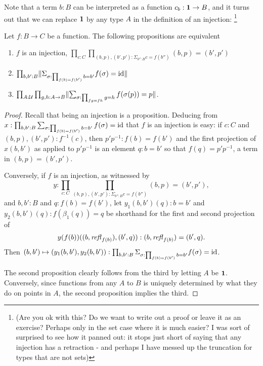 Note that a term $b:B$ can be interpreted as a function $c_b:\mathbf{1}\to B$, and it turns out that we can replace $\mathbf{1}$ by any type $A$ in the definition of an injection:
\footnote{(Are you ok with this?  Do we want to write out a proof or leave it as an exercise?
  Perhaps only in the set case where it is much easier?
  I was sort of surprised to see how it panned out: it stops just short of saying that any injection has a retraction - and perhaps I have messed up the truncation for types that are not sets)}
\begin{lemma} Let $f:B\to C$ be a function.
  The following propositions are equivalent
  \begin{enumerate}
  \item $f$ is an injection, \ie $\prod_{c:C}\prod_{(b,p),(b',p'):\Sigma_{b'':B}c=f(b'')}(b,p)=(b',p')$
  \item $\prod_{b,b':B}\lVert\Sigma_{\sigma:\prod_{f(b)=f(b')}b=b'}f(\sigma)=\mathord{\mathrm{id}}\rVert$
  \item $\prod_{A:\mathcal{U}}\prod_{g,h:A\to B}\lVert\sum_{\sigma:\prod_{fg=fh}g=h}f(\sigma(p))=p\rVert$.
  \end{enumerate}
\end{lemma}
\begin{proof}
  Recall that being an injection is a proposition.  Deducing from $x:\prod_{b,b':B}\sum_{\sigma:\prod_{f(b)=f(b')}b=b'}f(\sigma)=\mathord{\mathrm{id}}$ that $f$ is an injection is easy: if $c:C$ and $(b,p),(b',p'):f^{-1}(c)$, then $p'p^{-1}:f(b)=f(b')$ and the first projection of $x(b,b')$ as applied to $p'p^{-1}$ is an element $q:b=b'$ so that $f(q)=p'p^{-1}$, \ie a term in $(b,p)=(b',p')$.

  Conversely, if $f$ is an injection, as witnessed by
  $$y:\prod_{c:C}\prod_{(b,p),(b',p'):\Sigma_{b'':B}c=f(b'')}(b,p)=(b',p'),$$
  and $b,b':B$ and $q:f(b)=f(b')$, let $y_1(b,b')(q):b=b'$ and  $y_2(b,b')(q):f(\beta_1(q))=q$ be shorthand for the first and second projection of $$y(f(b))((b,\mathop{\mathit{refl}_{f(b)}}),(b',q)):(b,\mathop{\mathit{refl}_{f(b)}})=(b',q).$$
  Then $(b,b')\mapsto (y_1(b,b'),y_2(b,b')):\prod_{b,b':B}\Sigma_{\sigma:\prod_{f(b)=f(b')}b=b'}f(\sigma)=\mathord{\mathrm{id}}$.

  

  The second proposition clearly follows from the third by letting $A$ be $\mathbf{1}$.  Conversely, since functions from any $A$ to $B$ is uniquely determined by what they do on points in $A$, the second proposition implies the third.
\end{proof}

